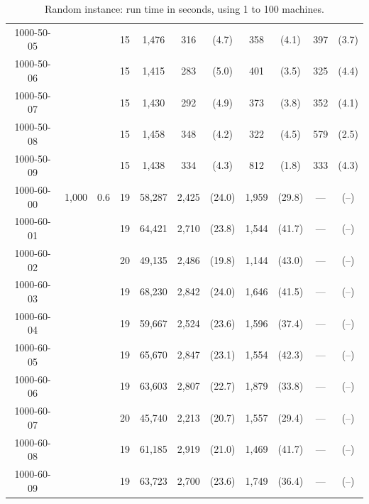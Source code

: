 \documentclass{l4proj}
\begin{document}
\begin{table}
\begin{center}
\begin{scriptsize}
\begin{tabular}{|c|c|c|c|c|c c|c c|c c|}
1000-50-05   &&& 15    & 1,476       & 316      & (4.7)    & 358      & (4.1)    & 397      & (3.7)    \\
1000-50-06   &&& 15    & 1,415       & 283      & (5.0)    & 401      & (3.5)    & 325      & (4.4)    \\
1000-50-07   &&& 15    & 1,430       & 292      & (4.9)    & 373      & (3.8)    & 352      & (4.1)    \\
1000-50-08   &&& 15    & 1,458       & 348      & (4.2)    & 322      & (4.5)    & 579      & (2.5)    \\
1000-50-09   &&& 15    & 1,438       & 334      & (4.3)    & 812      & (1.8)    & 333      & (4.3)    \\
1000-60-00   & 1,000 & 0.6 & 19    & 58,287      & 2,425     & (24.0)   & 1,959     & (29.8)   & --- & (--)   \\
1000-60-01   &&& 19    & 64,421      & 2,710     & (23.8)   & 1,544     & (41.7)   & --- & (--)   \\
1000-60-02   &&& 20    & 49,135      & 2,486     & (19.8)   & 1,144     & (43.0)   & --- & (--)   \\
1000-60-03   &&& 19    & 68,230      & 2,842     & (24.0)   & 1,646     & (41.5)   & --- & (--)   \\
1000-60-04   &&& 19    & 59,667      & 2,524     & (23.6)   & 1,596     & (37.4)   & --- & (--)   \\
1000-60-05   &&& 19    & 65,670      & 2,847     & (23.1)   & 1,554     & (42.3)   & --- & (--)   \\
1000-60-06   &&& 19    & 63,603      & 2,807     & (22.7)   & 1,879     & (33.8)   & --- & (--)   \\
1000-60-07   &&& 20    & 45,740      & 2,213     & (20.7)   & 1,557     & (29.4)   & --- & (--)   \\
1000-60-08   &&& 19    & 61,185      & 2,919     & (21.0)   & 1,469     & (41.7)   & --- & (--)   \\
1000-60-09   &&& 19    & 63,723      & 2,700     & (23.6)   & 1,749     & (36.4)   & --- & (--)   \\ \hline

\end{tabular}
\end{scriptsize}
\end{center}
\caption{Random instance: run time in seconds, using 1 to 100 machines.}
\label{randomTable}
\end{table}
\end{document}
